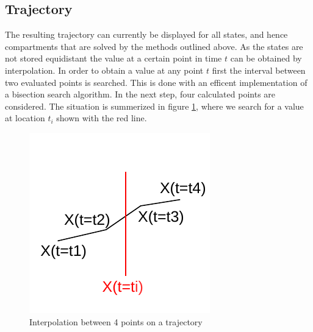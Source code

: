 \documentclass[a4paper,12pt]{article}
\begin{document}
\subsection{Trajectory}
The resulting trajectory can currently be displayed for all states,
and hence compartments that are solved by the methods outlined above.
As the states are not stored equidistant the value at a certain point
in time $t$ can be obtained by interpolation. In order to obtain a
value at any point $t$ first the interval between two evaluated points
is searched. This is done with an efficent implementation of a
bisection search algorithm. In the next step, four calculated points
are considered. The situation is summerized in figure
\ref{fig-interpol},
where we search for a value at location $t_i$ shown with the red line.
\begin{figure}
  \begin{center}
    \includegraphics{interpolation.pdf}
  \end{center}
  \caption{Interpolation between 4 points on a trajectory}
  \label{fig-interpol}
\end{figure}
\end{document}
